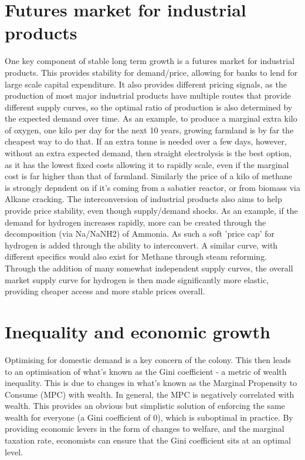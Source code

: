 \documentclass[10pt]{article}
\begin{document}
\section{Futures market for industrial products}
One key component of stable long term growth is a futures market for industrial products. This provides stability for demand/price, allowing for banks to lend for large scale capital expenditure. It also provides different pricing signals, as the production of most major industrial products have multiple routes that provide different supply curves, so the optimal ratio of production is also determined by the expected demand over time. As an example, to produce a marginal extra kilo of oxygen, one kilo per day for the next 10 years, growing farmland is by far the cheapest way to do that. If an extra tonne is needed over a few days, however, without an extra expected demand, then straight electrolysis is the best option, as it has the lowest fixed costs allowing it to rapidly scale, even if the marginal cost is far higher than that of farmland. Similarly the price of a kilo of methane is strongly depndent on if it's coming from a sabatier reactor, or from biomass via Alkane cracking. The interconversion of industrial products also aims to help provide price stability, even though supply/demand shocks. As an example, if the demand for hydrogen increases rapidly, more can be created through the decomposition (via Na/NaNH2) of Ammonia. As such a soft 'price cap' for hydrogen is added through the ability to interconvert. A similar curve, with different specifics would also exist for Methane through steam reforming. Through the addition of many somewhat independent supply curves, the overall market supply curve for hydrogen is then made significantly more elastic, providing cheaper access and more stable prices overall.

\section{Inequality and economic growth}
Optimising for domestic demand is a key concern of the colony. This then leads to an optimisation of what's known as the Gini coefficient - a metric of wealth inequality. This is due to changes in what's known as the Marginal Propensity to Consume (MPC) with wealth. In general, the MPC is negatively correlated with wealth. This provides an obvious but simplistic solution of enforcing the same wealth for everyone (a Gini coefficient of 0), which is suboptimal in practice. By providing economic levers in the form of changes to welfare, and the marginal taxation rate, economists can ensure that the Gini coefficient sits at an optimal level.
\end{document}
